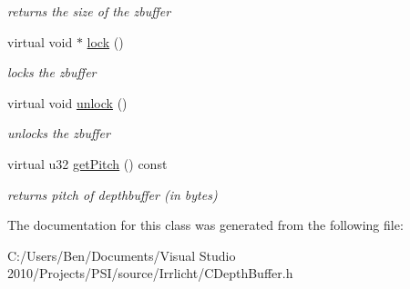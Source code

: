 \begin{DoxyCompactItemize}
\begin{DoxyCompactList}\small\item\em returns the size of the zbuffer \end{DoxyCompactList}\item 
\hypertarget{classirr_1_1video_1_1_c_depth_buffer_a4af18921c14a37a96f9727d780799fa1}{virtual void $\ast$ \hyperlink{classirr_1_1video_1_1_c_depth_buffer_a4af18921c14a37a96f9727d780799fa1}{lock} ()}\label{classirr_1_1video_1_1_c_depth_buffer_a4af18921c14a37a96f9727d780799fa1}

\begin{DoxyCompactList}\small\item\em locks the zbuffer \end{DoxyCompactList}\item 
\hypertarget{classirr_1_1video_1_1_c_depth_buffer_a541fd294a2d83ddc52fd19af2a1431dc}{virtual void \hyperlink{classirr_1_1video_1_1_c_depth_buffer_a541fd294a2d83ddc52fd19af2a1431dc}{unlock} ()}\label{classirr_1_1video_1_1_c_depth_buffer_a541fd294a2d83ddc52fd19af2a1431dc}

\begin{DoxyCompactList}\small\item\em unlocks the zbuffer \end{DoxyCompactList}\item 
\hypertarget{classirr_1_1video_1_1_c_depth_buffer_a0b9fb438f9aa4f4e76fb90e6f286c268}{virtual u32 \hyperlink{classirr_1_1video_1_1_c_depth_buffer_a0b9fb438f9aa4f4e76fb90e6f286c268}{get\-Pitch} () const }\label{classirr_1_1video_1_1_c_depth_buffer_a0b9fb438f9aa4f4e76fb90e6f286c268}

\begin{DoxyCompactList}\small\item\em returns pitch of depthbuffer (in bytes) \end{DoxyCompactList}\end{DoxyCompactItemize}


The documentation for this class was generated from the following file\-:\begin{DoxyCompactItemize}
\item 
C\-:/\-Users/\-Ben/\-Documents/\-Visual Studio 2010/\-Projects/\-P\-S\-I/source/\-Irrlicht/C\-Depth\-Buffer.\-h\end{DoxyCompactItemize}
